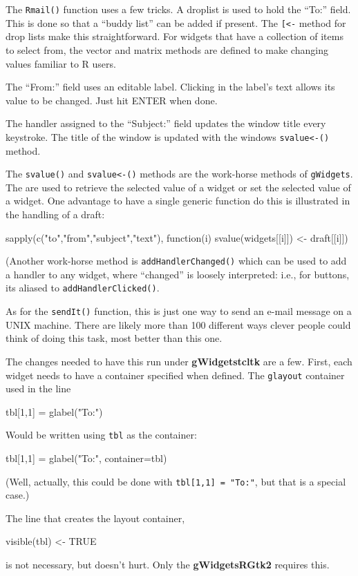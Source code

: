 \documentclass[12pt]{article}
\newcommand{\RCode}[1]{\texttt{#1}}
\newcommand{\RFunc}[1]{\texttt{#1()}}
\newcommand{\RPackage}[1]{\textbf{#1}}
\begin{document}
The \RFunc{Rmail} function uses a few  tricks.  A droplist is
used to hold the ``To:'' field. This is done so that a ``buddy list''
can be added if present. The \RCode{[<-} method for drop lists make
this straightforward. For widgets that have a collection of items to
select from, the vector and matrix methods are defined to make
changing values familiar to R users.

The ``From:'' field uses an editable label. Clicking in the label's
text allows its value to be changed. Just hit ENTER when done.

The handler assigned to the ``Subject:'' field updates the window
title every keystroke. The title of the window is updated with the windows
\RFunc{svalue<-} method.

The \RFunc{svalue} and \RFunc{svalue<-} methods are the work-horse
methods of \RCode{gWidgets}. The are used to retrieve the selected
value of a widget or set the selected value of a widget. One advantage
to have a single generic function do this is illustrated in the
handling of a draft:
\begin{Soutput}
 sapply(c("to","from","subject","text"), function(i)
   svalue(widgets[[i]]) <- draft[[i]])
\end{Soutput}

(Another work-horse method is \RFunc{addHandlerChanged} which can be
used to add a handler to any widget, where ``changed'' is loosely
interpreted: i.e., for buttons, its aliased to
\RFunc{addHandlerClicked}.

As for the \RFunc{sendIt} function, this is just one way to send an
e-mail message on a UNIX machine. There are likely more than 100
different ways clever people could think of doing this task, most better than
this one.

The changes needed to have this run under \RPackage{gWidgetstcltk} are
a few. First, each widget needs to have a container specified when
defined. The \RCode{glayout} container used in the line
\begin{Soutput}
  tbl[1,1] = glabel("To:")  
\end{Soutput}
 Would be written using \RCode{tbl} as the container:
 \begin{Soutput}
   tbl[1,1] = glabel("To:", container=tbl)  
 \end{Soutput}
(Well, actually, this could be done with \RCode{tbl[1,1] = "To:"}, but
  that is a special case.)

The line that creates the layout container,
\begin{Soutput}
  visible(tbl) <- TRUE  
\end{Soutput}
is not necessary, but doesn't hurt. Only the \RPackage{gWidgetsRGtk2}
requires this.
\end{document}
